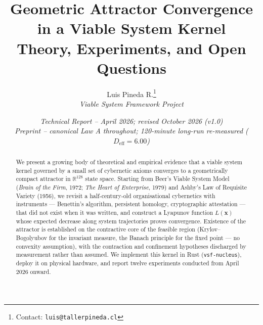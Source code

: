 \documentclass[11pt, a4paper]{article}
\title{%
  \textbf{Geometric Attractor Convergence in a Viable System Kernel}\\[4pt]
  \large Theory, Experiments, and Open Questions
}
\author{
  Luis Pineda R.\thanks{Contact: \texttt{luis@tallerpineda.cl}} \\[2pt]
  \small\textit{Viable System Framework Project}
}
\date{\textit{Technical Report -- April 2026; revised October 2026 (v1.0)} \\ \small \textit{Preprint -- canonical Law A throughout; 120-minute long-run re-measured ($D_\text{eff}=6.00$)}}
\newcommand{\R}{\mathbb{R}}
\newcommand{\sv}{\bm{x}}
\newcommand{\nucleus}{\texttt{vsf-nucleus}}
\begin{document}
\maketitle

\begin{abstract}
We present a growing body of theoretical and empirical evidence that a viable
system kernel governed by a small set of cybernetic axioms converges to a
geometrically compact attractor in $\R^{128}$ state space.
Starting from Beer's Viable System Model (\emph{Brain of the Firm}, 1972;
\emph{The Heart of Enterprise}, 1979) and Ashby's Law of Requisite Variety
(1956), we revisit a half-century-old organisational cybernetics with
instruments --- Benettin's algorithm, persistent homology, cryptographic
attestation --- that did not exist when it was written, and construct a Lyapunov
function $L(\sv)$ whose expected decrease along system trajectories proves
convergence. Existence of the attractor is established on the contractive
core of the feasible region (Krylov--Bogolyubov for the invariant measure,
the Banach principle for the fixed point --- no convexity assumption), with
the contraction and confinement hypotheses discharged by measurement rather than
assumed.
We implement this kernel in Rust (\nucleus{}), deploy it on physical hardware,
and report twelve experiments conducted from April 2026 onward.


\end{abstract}
\end{document}
